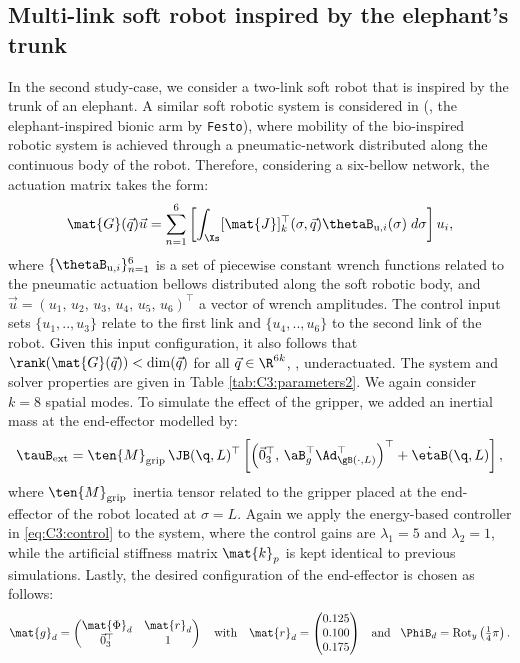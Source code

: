 \subsection{Multi-link soft robot inspired by the elephant's trunk}
In the second study-case, we consider a two-link soft robot that is inspired by the trunk of an elephant. A similar soft robotic system is considered in \cite{Falkenhahn2015} (\ie, the elephant-inspired bionic arm by \texttt{Festo}), where mobility of the bio-inspired robotic system is achieved through a pneumatic-network distributed along the continuous body of the robot. Therefore, considering a six-bellow network, the actuation matrix takes the form:
%
\begin{equation*}
\mat{G}(\vec{q})\vec{u} = \sum_{n=1}^6 \left[ \int_\Xs [\mat{J}]_k^\top(\sigma,\vec{q}) \thetaB_{\textrm{u},i}(\sigma)\; d\sigma\right] u_i,
\end{equation*}
%
where $\{\thetaB_{\textrm{u},i}\}_{n=1}^6$ is a set of piecewise constant wrench functions related to the pneumatic actuation bellows distributed along the soft robotic body, and $\vec{u} = (u_1,\,u_2,\,u_3,\,u_4,\,u_5,\,u_6)^\top$ a vector of wrench amplitudes. The control input sets $\{u_1,..,u_3\}$ relate to the first link and $\{u_4,..,u_6\}$ to the second link of the robot. Given this input configuration, it also follows that $\rank(\mat{G}(\vec{q})) < \dim(\vec{q})$ for all $\vec{q} \in \R^{6k}$, \ie, underactuated. The system and solver properties are given in Table \ref{tab:C3:parameters2}. We again consider $k=8$ spatial modes. To simulate the effect of the gripper, we added an inertial mass at the end-effector modelled by:
%
$$\tauB_{\textrm{ext}} =  \ten{M}_{\textrm{grip}}\,\JB(\q,L)^\top \left[ \left(\vec{0}_3^\top,\, \aB_g ^\top \Ad^\top_{\gB(\cdot,L)} \right)^\top + \dot{\etaB}(\q,L) \right],$$
%
where $\ten{M}_{\textrm{grip}}$ inertia tensor related to the gripper placed at the end-effector of the robot located at $\sigma = L$. Again we apply the energy-based controller in \eqref{eq:C3:control} to the system, where the control gains are $\lambda_1 = 5$ and $\lambda_2 = 1$, while the artificial stiffness matrix $\mat{k}_p$ is kept identical to previous simulations. Lastly, the desired configuration of the end-effector is chosen as follows:
%
\begin{equation*}
\mat{g}_d = \begin{pmatrix} \mat{\Phi}_d & \mat{r}_d \\ \vec{0}_3^\top & 1 \end{pmatrix} \quad \text{with} \quad \mat{r}_d = \begin{pmatrix}  0.125 \\ 0.100 \\ 0.175  \end{pmatrix} \;\;\;\text{and} \;\;\; \PhiB_d = \textrm{Rot}_y\left(\tfrac{1}{4}\pi \right).
\end{equation*}
%

